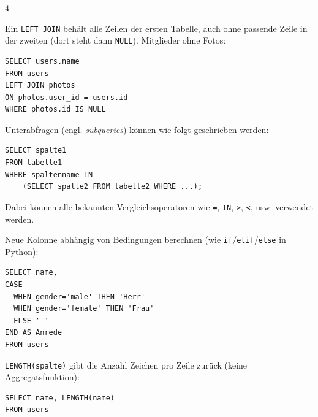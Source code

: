 \begin{landscape}
\begin{multicols*}{4}
\begin{cheatSheetBox}[title=Alle Zeilen behalten: \texorpdfstring{\lstinline|LEFT JOIN|}{LEFT JOIN}]
Ein \lstinline|LEFT JOIN| behält alle Zeilen der ersten Tabelle, auch ohne passende Zeile in der zweiten (dort steht dann \lstinline|NULL|). Mitglieder ohne Fotos:
\begin{lstlisting}
SELECT users.name
FROM users
LEFT JOIN photos
ON photos.user_id = users.id
WHERE photos.id IS NULL
\end{lstlisting}
\end{cheatSheetBox}

\begin{cheatSheetBox}[title=Unterabfragen (Subqueries)]
Unterabfragen (engl. \textit{subqueries}) können wie folgt geschrieben werden:
\begin{lstlisting}
SELECT spalte1
FROM tabelle1
WHERE spaltenname IN
    (SELECT spalte2 FROM tabelle2 WHERE ...);
\end{lstlisting}
Dabei können alle bekannten Vergleichsoperatoren wie \lstinline|=|, \lstinline|IN|, \lstinline|>|, \lstinline|<|, usw. verwendet werden.
\end{cheatSheetBox}

\begin{cheatSheetBox}[title=Verzweigungen: \texorpdfstring{\lstinline|CASE WHEN|}{CASE WHEN}]
Neue Kolonne abhängig von Bedingungen berechnen (wie \texttt{if}/\texttt{elif}/\texttt{else} in Python):
\begin{lstlisting}
SELECT name,
CASE
  WHEN gender='male' THEN 'Herr'
  WHEN gender='female' THEN 'Frau'
  ELSE '-'
END AS Anrede
FROM users
\end{lstlisting}
\end{cheatSheetBox}

\begin{cheatSheetBox}[title=Textlänge: \texorpdfstring{\lstinline|LENGTH|}{LENGTH}]
\lstinline|LENGTH(spalte)| gibt die Anzahl Zeichen pro Zeile zurück (keine Aggregatsfunktion):
\begin{lstlisting}
SELECT name, LENGTH(name)
FROM users
\end{lstlisting}
\end{cheatSheetBox}

\end{multicols*}

\end{landscape}
\restoregeometry